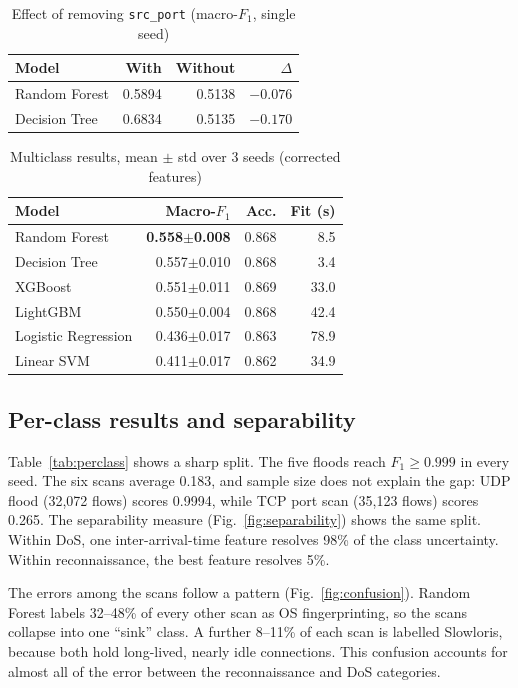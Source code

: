 \documentclass[conference]{IEEEtran}
\newcommand{\col}[1]{\texttt{\small #1}}
\begin{document}
\begin{table}[!t]
\caption{Effect of removing \col{src\_port} (macro-$F_1$, single seed)}
\label{tab:srcport}
\centering
\footnotesize
\begin{tabular}{@{}lrrr@{}}
\toprule
\textbf{Model} & \textbf{With} & \textbf{Without} & \textbf{$\Delta$} \\
\midrule
Random Forest & 0.5894 & 0.5138 & $-0.076$ \\
Decision Tree & 0.6834 & 0.5135 & $\mathbf{-0.170}$ \\
\bottomrule
\end{tabular}
\end{table}

\begin{table}[!t]
\caption{Multiclass results, mean $\pm$ std over 3 seeds (corrected features)}
\label{tab:results}
\centering
\footnotesize
\begin{tabular}{@{}lrrr@{}}
\toprule
\textbf{Model} & \textbf{Macro-$F_1$} & \textbf{Acc.} & \textbf{Fit (s)} \\
\midrule
Random Forest & \textbf{0.558$\pm$0.008} & 0.868 & 8.5 \\
Decision Tree & 0.557$\pm$0.010 & 0.868 & 3.4 \\
XGBoost & 0.551$\pm$0.011 & 0.869 & 33.0 \\
LightGBM & 0.550$\pm$0.004 & 0.868 & 42.4 \\
Logistic Regression & 0.436$\pm$0.017 & 0.863 & 78.9 \\
Linear SVM & 0.411$\pm$0.017 & 0.862 & 34.9 \\
\bottomrule
\end{tabular}
\end{table}

\subsection{Per-class results and separability}

Table~\ref{tab:perclass} shows a sharp split. The five floods reach $F_1 \ge 0.999$ in every seed. The six scans average 0.183, and sample size does not explain the gap: UDP flood (32,072 flows) scores 0.9994, while TCP port scan (35,123 flows) scores 0.265. The separability measure (Fig.~\ref{fig:separability}) shows the same split. Within DoS, one inter-arrival-time feature resolves 98\% of the class uncertainty. Within reconnaissance, the best feature resolves 5\%.

The errors among the scans follow a pattern (Fig.~\ref{fig:confusion}). Random Forest labels 32--48\% of every other scan as OS fingerprinting, so the scans collapse into one ``sink'' class. A further 8--11\% of each scan is labelled Slowloris, because both hold long-lived, nearly idle connections. This confusion accounts for almost all of the error between the reconnaissance and DoS categories.
\end{document}
